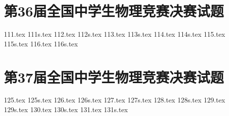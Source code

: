 \section{第36届全国中学生物理竞赛决赛试题}
{111.tex}
{111s.tex}
{112.tex}
{112s.tex}
{113.tex}
{113s.tex}
{114.tex}
{114s.tex}
{115.tex}
{115s.tex}
{116.tex}
{116s.tex}
\section{第37届全国中学生物理竞赛决赛试题}
{125.tex}
{125s.tex}
{126.tex}
{126s.tex}
{127.tex}
{127s.tex}
{128.tex}
{128s.tex}
{129.tex}
{129s.tex}
{130.tex}
{130s.tex}
{131.tex}
{131s.tex}
\newpage